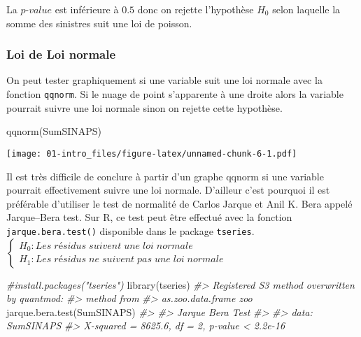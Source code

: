\documentclass[
]{book}
\newenvironment{Shaded}{\begin{snugshade}}{\end{snugshade}}
\newcommand{\CommentTok}[1]{\textcolor[rgb]{0.56,0.35,0.01}{\textit{#1}}}
\newcommand{\FunctionTok}[1]{\textcolor[rgb]{0.00,0.00,0.00}{#1}}
\newcommand{\NormalTok}[1]{#1}
\theoremstyle{definition}
\theoremstyle{definition}
\theoremstyle{definition}
\theoremstyle{definition}
\theoremstyle{remark}
\begin{document}
La \(p\)-\(value\) est inférieure à \(0.5\) donc on rejette l'hypothèse \(H_0\) selon laquelle la somme des sinistres suit une loi de poisson.

\hypertarget{loi-de-loi-normale}{%
\subsubsection{Loi de Loi normale}\label{loi-de-loi-normale}}

On peut tester graphiquement si une variable suit une loi normale avec la fonction \texttt{qqnorm}. Si le nuage de point s'apparente à une droite alors la variable pourrait suivre une loi normale sinon on rejette cette hypothèse.

\begin{Shaded}
\begin{Highlighting}[]
\FunctionTok{qqnorm}\NormalTok{(SumSINAPS)}
\end{Highlighting}
\end{Shaded}

\texttt{[image: 01-intro\_files/figure-latex/unnamed-chunk-6-1.pdf]}

Il est très difficile de conclure à partir d'un graphe qqnorm si une variable pourrait effectivement suivre une loi normale. D'ailleur c'est pourquoi il est préférable d'utiliser le test de normalité de Carlos Jarque et Anil K. Bera appelé Jarque--Bera test. Sur R, ce test peut être effectué avec la fonction \texttt{jarque.bera.test()} disponible dans le package \texttt{tseries}.
\(\begin{cases}  H_0: Les\; résidus\; suivent\; une\; loi\; normale\\  H_1: Les \;résidus\; ne\; suivent\; pas\; une\; loi\; normale \end{cases}\)

\begin{Shaded}
\begin{Highlighting}[]
\CommentTok{\#install.packages("tseries")}
\FunctionTok{library}\NormalTok{(tseries)}
\CommentTok{\#\textgreater{} Registered S3 method overwritten by \textquotesingle{}quantmod\textquotesingle{}:}
\CommentTok{\#\textgreater{}   method            from}
\CommentTok{\#\textgreater{}   as.zoo.data.frame zoo}
\FunctionTok{jarque.bera.test}\NormalTok{(SumSINAPS)}
\CommentTok{\#\textgreater{} }
\CommentTok{\#\textgreater{}  Jarque Bera Test}
\CommentTok{\#\textgreater{} }
\CommentTok{\#\textgreater{} data:  SumSINAPS}
\CommentTok{\#\textgreater{} X{-}squared = 8625.6, df = 2, p{-}value \textless{} 2.2e{-}16}
\end{Highlighting}
\end{Shaded}
\end{document}
